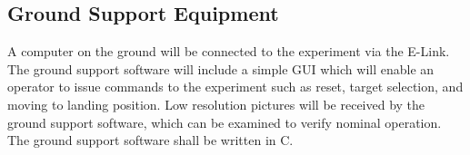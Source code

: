 \pagebreak
\subsection{Ground Support Equipment}\label{sec:4.9}
A computer on the ground will be connected to the experiment via the E-Link. The ground support software will include a simple GUI which will enable an operator to issue commands to the experiment such as reset, target selection, and moving to landing position. Low resolution pictures will be received by the ground support software, which can be examined to verify nominal operation. The ground support software shall be written in C.

\raggedbottom
